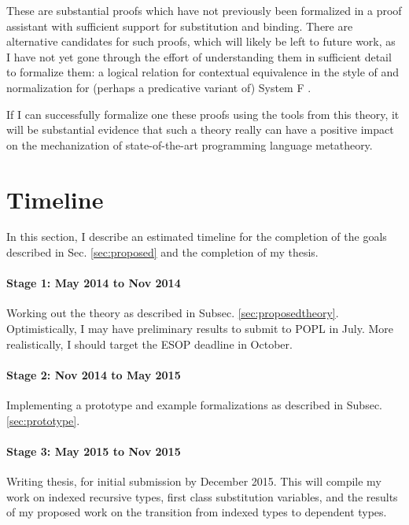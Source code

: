 \documentclass{article}
\begin{document}
These are substantial proofs which have not previously been
formalized in a proof assistant with sufficient support for
substitution and binding. There are alternative candidates for such
proofs, which will likely be left to future work, as I have not yet
gone through the effort of understanding them in sufficient detail to
formalize them: a logical relation
for contextual equivalence in the style of
\cite{Dreyer11} and normalization for (perhaps a predicative variant
of) System F \citep{ProofsAndTypes,Altenkirch93}.

If I can successfully formalize one these proofs using the tools from
this theory, it will be substantial evidence that such a theory really
can have a positive impact on the mechanization of state-of-the-art
programming language metatheory.


\section{Timeline}
In this section, I describe an estimated timeline for the completion
of the goals described in Sec. \ref{sec:proposed} and the
completion of my thesis.

\paragraph{Stage 1:  May 2014 to Nov 2014} Working out the
theory as described in Subsec. \ref{sec:proposedtheory}. Optimistically, I may have preliminary results to submit
to POPL in July. More realistically, I should target the ESOP deadline in October.

\paragraph{Stage 2: Nov 2014 to May 2015} Implementing a prototype and
example formalizations as described in Subsec. \ref{sec:prototype}.

\paragraph{Stage 3: May 2015 to Nov 2015} Writing thesis, for initial submission by
December 2015. This will compile my work on indexed recursive types, first class substitution
variables, and the results of my proposed work on the transition from indexed types
to dependent types.
\end{document}
